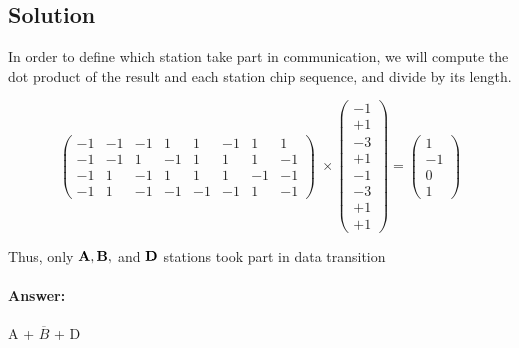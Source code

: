 \documentclass[11pt]{article}
\begin{document}
        \subsection{Solution}
    In order to define which station take part in communication,
    we will compute the dot product of the result and
    each station chip sequence, and divide by its length.

        \[
            \begin{pmatrix}
                -1 & -1 & -1 & 1 & 1 & -1 & 1 & 1 \\
                -1 & -1 & 1 & -1 & 1 & 1 & 1 & -1 \\
                -1 & 1 & -1 & 1 & 1 & 1 & -1 & -1 \\
                -1 & 1 & -1 & -1 & -1 & -1 & 1 & -1
              \end{pmatrix} \;
              \times
              \begin{pmatrix}
                -1\\ +1\\ -3\\ +1\\ -1\\ -3\\ +1\\ +1
              \end{pmatrix}
                =
              \begin{pmatrix}
                  1 \\ -1 \\ 0 \\ 1
              \end{pmatrix}
        \]

    Thus, only $\bf A, B,$ and $\bf D$ stations took part in data transition
    \paragraph{Answer:} A + $\overline{B}$ + D
\end{document}
